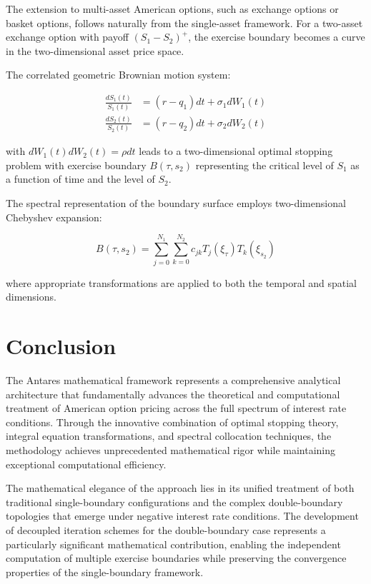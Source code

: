 \documentclass[
  american,
  11pt,
  11pt,
  letterpaper,
  onecolumn]{article}
\begin{document}
The extension to multi-asset American options, such as exchange options
or basket options, follows naturally from the single-asset framework.
For a two-asset exchange option with payoff \((S_1 - S_2)^+\), the
exercise boundary becomes a curve in the two-dimensional asset price
space.

The correlated geometric Brownian motion system:

\[\begin{aligned}
\frac{dS_1(t)}{S_1(t)} &= (r-q_1)dt + \sigma_1 dW_1(t) \\
\frac{dS_2(t)}{S_2(t)} &= (r-q_2)dt + \sigma_2 dW_2(t)
\end{aligned} \tag{8.8}\]

with \(dW_1(t) dW_2(t) = \rho dt\) leads to a two-dimensional optimal
stopping problem with exercise boundary \(B(\tau,s_2)\) representing the
critical level of \(S_1\) as a function of time and the level of
\(S_2\).

The spectral representation of the boundary surface employs
two-dimensional Chebyshev expansion:

\[B(\tau,s_2) = \sum_{j=0}^{N_1} \sum_{k=0}^{N_2} c_{jk} T_j(\xi_\tau) T_k(\xi_{s_2}) \tag{8.9}\]

where appropriate transformations are applied to both the temporal and
spatial dimensions.

\section{Conclusion}\label{conclusion}

The Antares mathematical framework represents a comprehensive analytical
architecture that fundamentally advances the theoretical and
computational treatment of American option pricing across the full
spectrum of interest rate conditions. Through the innovative combination
of optimal stopping theory, integral equation transformations, and
spectral collocation techniques, the methodology achieves unprecedented
mathematical rigor while maintaining exceptional computational
efficiency.

The mathematical elegance of the approach lies in its unified treatment
of both traditional single-boundary configurations and the complex
double-boundary topologies that emerge under negative interest rate
conditions. The development of decoupled iteration schemes for the
double-boundary case represents a particularly significant mathematical
contribution, enabling the independent computation of multiple exercise
boundaries while preserving the convergence properties of the
single-boundary framework.
\end{document}
